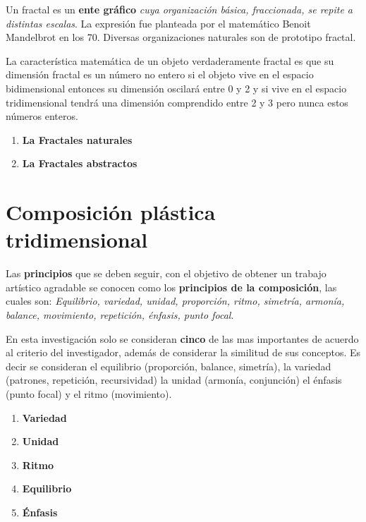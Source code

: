 \documentclass[12pt,]{report}
\providecommand{\tightlist}{%
  \setlength{\itemsep}{0pt}\setlength{\parskip}{0pt}}
\begin{document}
Un fractal es un \textbf{ente gráfico} \emph{cuya organización básica, fraccionada, se repite a distintas
escalas}. La expresión fue planteada por el matemático Benoit Mandelbrot en los 70. Diversas
organizaciones naturales son de prototipo fractal.

La característica matemática de un objeto verdaderamente fractal es que su dimensión fractal es un número no entero si el objeto vive
en el espacio bidimensional entonces su dimensión oscilará entre 0 y 2 y si vive en el espacio
tridimensional tendrá una dimensión comprendido entre 2 y 3 pero nunca estos números
enteros.

\begin{enumerate}
\def\labelenumi{\arabic{enumi}.}
\item
  \textbf{La Fractales naturales}
\item
  \textbf{La Fractales abstractos}
\end{enumerate}

\hypertarget{composiciuxf3n-pluxe1stica-tridimensional}{%
\section{Composición plástica tridimensional}\label{composiciuxf3n-pluxe1stica-tridimensional}}

Las \textbf{principios} que se deben seguir, con el objetivo de obtener un trabajo artístico agradable se
conocen como los \textbf{principios de la composición}, las cuales son: \emph{Equilibrio, variedad, unidad,
proporción, ritmo, simetría, armonía, balance, movimiento, repetición, énfasis, punto focal}.

En esta investigación solo se consideran \textbf{cinco} de las mas importantes de acuerdo al criterio
del investigador, además de considerar la similitud de sus conceptos. Es decir se consideran
el equilibrio (proporción, balance, simetría), la variedad (patrones, repetición, recursividad)
la unidad (armonía, conjunción) el énfasis (punto focal) y el ritmo (movimiento).

\begin{enumerate}
\def\labelenumi{\arabic{enumi}.}
\tightlist
\item
  \textbf{Variedad}
\item
  \textbf{Unidad}
\item
  \textbf{Ritmo}
\item
  \textbf{Equilibrio}
\item
  \textbf{Énfasis}
\end{enumerate}
\end{document}
